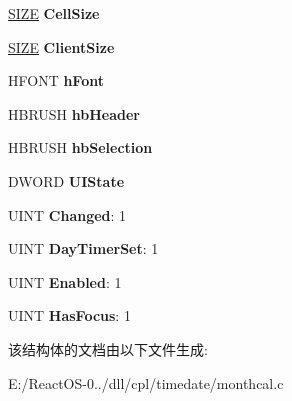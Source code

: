 \begin{DoxyCompactItemize}
\item 
\mbox{\label{struct___m_o_n_t_h_c_a_l_w_n_d_a1e2fb765af129d823558c6ace3d1c65d}} 
\hyperlink{structtag_s_i_z_e}{S\+I\+ZE} {\bfseries Cell\+Size}
\item 
\mbox{\label{struct___m_o_n_t_h_c_a_l_w_n_d_a852fd7ef53ada4575331bcd3ada9db2c}} 
\hyperlink{structtag_s_i_z_e}{S\+I\+ZE} {\bfseries Client\+Size}
\item 
\mbox{\label{struct___m_o_n_t_h_c_a_l_w_n_d_a05fb20f76dac7858a69e89ddba79a382}} 
H\+F\+O\+NT {\bfseries h\+Font}
\item 
\mbox{\label{struct___m_o_n_t_h_c_a_l_w_n_d_a880eeebd4fa9115be249e7863cdc87c9}} 
H\+B\+R\+U\+SH {\bfseries hb\+Header}
\item 
\mbox{\label{struct___m_o_n_t_h_c_a_l_w_n_d_a7ba6c7aff8e705c7c319f745cc164384}} 
H\+B\+R\+U\+SH {\bfseries hb\+Selection}
\item 
\mbox{\label{struct___m_o_n_t_h_c_a_l_w_n_d_ad6ef6bb9191939379cf994c6ad0abe0c}} 
D\+W\+O\+RD {\bfseries U\+I\+State}
\item 
\mbox{\label{struct___m_o_n_t_h_c_a_l_w_n_d_a56b770293b0f730acdf909478a4dcec2}} 
U\+I\+NT {\bfseries Changed}\+: 1
\item 
\mbox{\label{struct___m_o_n_t_h_c_a_l_w_n_d_a1dcebcb7fa760bbe41319265db41e146}} 
U\+I\+NT {\bfseries Day\+Timer\+Set}\+: 1
\item 
\mbox{\label{struct___m_o_n_t_h_c_a_l_w_n_d_a809a8f9e68b0c019d738eee353783204}} 
U\+I\+NT {\bfseries Enabled}\+: 1
\item 
\mbox{\label{struct___m_o_n_t_h_c_a_l_w_n_d_a358adbd5a65bfe88bc751556c819ed04}} 
U\+I\+NT {\bfseries Has\+Focus}\+: 1
\end{DoxyCompactItemize}


该结构体的文档由以下文件生成\+:\begin{DoxyCompactItemize}
\item 
E\+:/\+React\+O\+S-\/0../dll/cpl/timedate/monthcal.\+c\end{DoxyCompactItemize}
